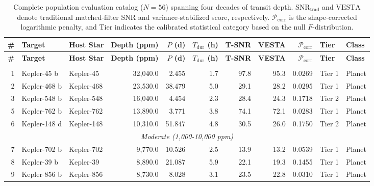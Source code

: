 \begin{longtable}{r l l r r r r r r l l}
\caption{Complete population evaluation catalog ($N=56$) spanning four decades of transit depth. $\text{SNR}_{\text{trad}}$ and $\text{VESTA}$ denote traditional matched-filter SNR and variance-stabilized score, respectively. $\mathcal{P}_{\text{corr}}$ is the shape-corrected logarithmic penalty, and Tier indicates the calibrated statistical category based on the null $F$-distribution.}\label{tab:full_population_catalog}\\
\hline\hline
\textbf{\#} & \textbf{Target} & \textbf{Host Star} & \textbf{Depth (ppm)} & \textbf{$P$ (d)} & \textbf{$T_{\text{dur}}$ (h)} & \textbf{T-SNR} & \textbf{VESTA} & \textbf{$\mathcal{P}_{\text{corr}}$} & \textbf{Tier} & \textbf{Class} \\
\hline
\endfirsthead
\hline\hline
\textbf{\#} & \textbf{Target} & \textbf{Host Star} & \textbf{Depth (ppm)} & \textbf{$P$ (d)} & \textbf{$T_{\text{dur}}$ (h)} & \textbf{T-SNR} & \textbf{VESTA} & \textbf{$\mathcal{P}_{\text{corr}}$} & \textbf{Tier} & \textbf{Class} \\
\hline
\endhead
\hline
\endfoot
\hline
\multicolumn{11}{c}{\textit{Ultra-Deep (>10,000 ppm)}} \\
\hline
 1 & Kepler-45 b      & Kepler-45    &  32,040.0 &   2.455 &   1.7 &   97.8 &   95.3 &  0.0269 & Tier 1  & Planet \\
 2 & Kepler-468 b     & Kepler-468   &  23,530.0 &  38.479 &   5.0 &   29.1 &   28.2 &  0.0295 & Tier 1  & Planet \\
 3 & Kepler-548 b     & Kepler-548   &  16,040.0 &   4.454 &   2.3 &   28.4 &   24.3 &  0.1718 & Tier 2  & Planet \\
 5 & Kepler-762 b     & Kepler-762   &  13,890.0 &   3.771 &   3.8 &   74.1 &   72.1 &  0.0283 & Tier 1  & Planet \\
 6 & Kepler-148 d     & Kepler-148   &  10,310.0 &  51.847 &   4.8 &   30.5 &   26.0 &  0.1750 & Tier 2  & Planet \\
\hline
\multicolumn{11}{c}{\textit{Moderate (1,000-10,000 ppm)}} \\
\hline
 7 & Kepler-702 b     & Kepler-702   &   9,770.0 &  10.526 &   2.5 &   13.9 &   13.2 &  0.0539 & Tier 1  & Planet \\
 8 & Kepler-39 b      & Kepler-39    &   8,890.0 &  21.087 &   5.9 &   22.1 &   19.3 &  0.1455 & Tier 1  & Planet \\
 9 & Kepler-856 b     & Kepler-856   &   8,730.0 &   8.028 &   3.1 &   23.5 &   22.8 &  0.0310 & Tier 1  & Planet \\

\end{longtable}
